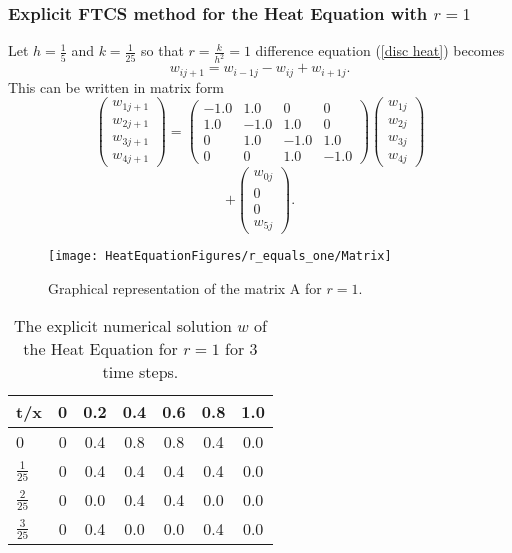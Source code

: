 \begin{example}
\subsubsection{Explicit FTCS method for the Heat Equation with $r=1$}
Let $h=\frac{1}{5}$ and $k=\frac{1}{25}$ so that $r=\frac{k}{h^2}=1$
difference equation (\ref{disc heat}) becomes
\[
w_{ij+1}=w_{i-1j}-w_{ij}+w_{i+1j}.
\]
This can be written in matrix form 
\[
\left(\begin{array}{c}
w_{1j+1}\\
w_{2j+1}\\
w_{3j+1}\\
w_{4j+1}
\end{array}\right)
=
\left(\begin{array}{cccc}
-1.0&1.0&0&0\\
1.0&-1.0&1.0&0\\
0&1.0&-1.0&1.0\\
0&0&1.0&-1.0
\end{array}\right)
\left(\begin{array}{c}
w_{1j}\\
w_{2j}\\
w_{3j}\\
w_{4j}
\end{array}\right)\]\[+\left(\begin{array}{c}
w_{0j}\\
0\\
0\\
w_{5j}
\end{array}\right).
\]
\begin{figure}[H]
  \caption{Graphical representation of the matrix A for $r=1$.}
  \centering
    \texttt{[image: HeatEquationFigures/r\_equals\_one/Matrix]}
\end{figure}


\begin{center}
\begin{table}[H]
 \caption{The explicit numerical solution $w$ of the Heat Equation for $r=1$ for 3 time steps.}
 \centering
\begin{tabular}{l|cccccc}
t/x&0&0.2&0.4&0.6&0.8&1.0\\ \hline
0&0&0.4&0.8&0.8&0.4&0.0\\
$\frac{1}{25}$&0&0.4&0.4&0.4&0.4&0.0\\
$\frac{2}{25}$&0&0.0&0.4&0.4&0.0&0.0\\
$\frac{3}{25}$&0&0.4&0.0&0.0&0.4&0.0\\
\end{tabular}
\end{table}
\end{center}


\end{example}

